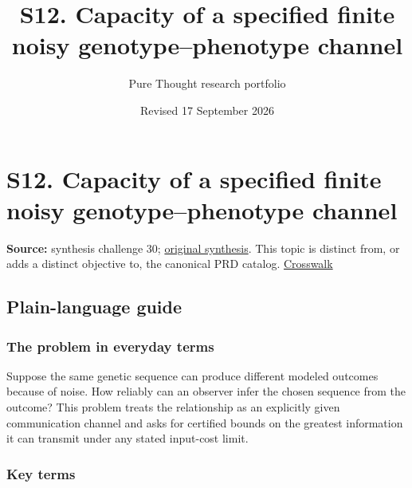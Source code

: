 \documentclass[
  11pt,
]{article}
\title{S12. Capacity of a specified finite noisy genotype--phenotype
channel}
\author{Pure Thought research portfolio}
\date{Revised 17 September 2026}
\begin{document}
\maketitle
\thispagestyle{empty}
\clearpage

\section{S12. Capacity of a specified finite noisy genotype--phenotype
channel}

\textbf{Source:} synthesis challenge 30;
\href{https://github.com/rick-stevens-ai/Pure-Thought/blob/main/NOTES/30-Most-Compelling-Pure-Thought-AI-Challenges.md}{original
synthesis}. This topic is distinct from, or adds a distinct objective
to, the canonical PRD catalog.
\href{https://github.com/rick-stevens-ai/Pure-Thought/blob/main/reviews/SYNTHESIS-CROSSWALK.md}{Crosswalk}

\subsection{Plain-language guide}

\subsubsection{The problem in everyday terms}

Suppose the same genetic sequence can produce different modeled outcomes
because of noise. How reliably can an observer infer the chosen sequence
from the outcome? This problem treats the relationship as an explicitly
given communication channel and asks for certified bounds on the
greatest information it can transmit under any stated input-cost limit.

\subsubsection{Key terms}
\end{document}
